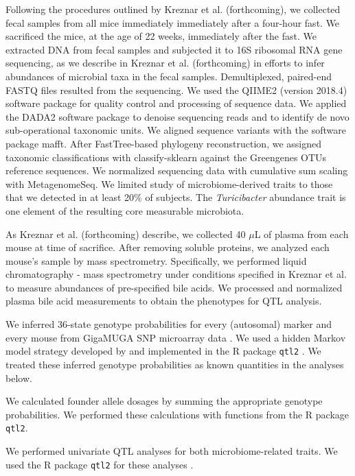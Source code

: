 \documentclass[oneside]{book}
\begin{document}
Following the procedures outlined by Kreznar et al. (forthcoming), we collected fecal samples from all mice immediately immediately after a four-hour fast. We sacrificed the mice, at the age of 22 weeks, immediately after the fast. We extracted DNA from fecal samples and subjected it to 16S ribosomal RNA gene sequencing, as we describe in Kreznar et al. (forthcoming) in efforts to infer abundances of microbial taxa in the fecal samples. Demultiplexed, paired-end FASTQ files resulted from the sequencing. We used the QIIME2 (version 2018.4) software package for quality control and processing of sequence data. We applied the DADA2 software package to denoise sequencing reads and to identify de novo sub-operational taxonomic units. We aligned sequence variants with the software package mafft. After FastTree-based phylogeny reconstruction, we assigned taxonomic classifications with classify-sklearn against the Greengenes OTUs reference sequences. We normalized sequencing data with cumulative sum scaling with MetagenomeSeq. We limited study of microbiome-derived traits to those that we detected in at least 20\% of subjects. The \emph{Turicibacter} abundance trait is one element of the resulting core measurable microbiota. 

As Kreznar et al. (forthcoming) describe, we collected 40 $\mu$L of plasma from each mouse at time of sacrifice. After removing soluble proteins, we analyzed each mouse's sample by mass spectrometry. Specifically, we performed liquid chromatography - mass spectrometry under conditions specified in Kreznar et al. to measure abundances of pre-specified bile acids. We processed and normalized plasma bile acid measurements to obtain the phenotypes for QTL analysis.

We inferred 36-state genotype probabilities for every (autosomal) marker and every mouse from GigaMUGA SNP microarray data \citep{morgan2015mouse}. We used a hidden Markov model strategy developed by \citet{broman2012genotype, broman2012haplotype} and implemented in the R package \texttt{qtl2} \citep{qtl2}. We treated these inferred genotype probabilities as known quantities in the analyses below.

We calculated founder allele dosages by summing the appropriate genotype probabilities. We performed these calculations with functions from the R package \texttt{qtl2}\citep{qtl2}.

We performed univariate QTL analyses for both microbiome-related traits. We used the R package \texttt{qtl2} for these analyses \citep{qtl2}.
\end{document}
